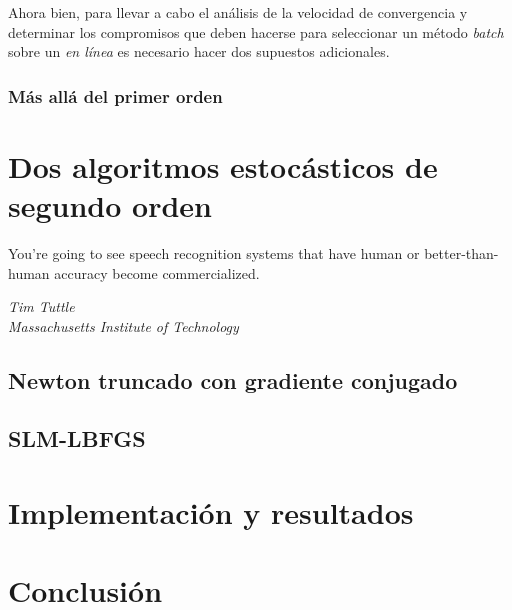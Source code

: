 \documentclass{book}
\theoremstyle{plain}
\theoremstyle{definition}
\theoremstyle{remark}
\begin{document}
Ahora bien, para llevar a cabo el análisis de la velocidad de convergencia y determinar los compromisos que deben hacerse para seleccionar un método \emph{batch} sobre un \emph{en línea} es necesario hacer dos supuestos adicionales. 

\subsection{Más allá del primer orden}


\chapter{Dos algoritmos estocásticos de segundo orden}

\epigraph{You're going to see speech recognition systems that have human or better-than-human accuracy become commercialized.}{\textit{Tim Tuttle \\ Massachusetts Institute of Technology}}

\newpage

\section{Newton truncado con gradiente conjugado}

\section{SLM-LBFGS}

\chapter{Implementación y resultados}

\chapter{Conclusión}
\end{document}
